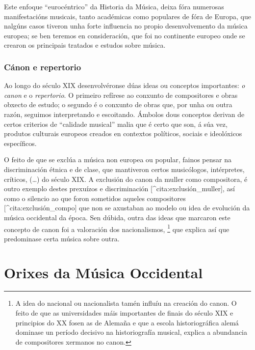 \documentclass[a4paper, twoside]{templates/ociamthesis}
\begin{document}
Este enfoque ``eurocéntrico'' da Historia da Música, deixa fóra numerosas manifestacións musicais, tanto académicas como populares de fóra de Europa, que nalgúns casos tiveron unha forte influencia no propio desenvolvemento da música europea; se ben teremos en consideración, que foi no continente europeo onde se crearon os principais tratados e estudos sobre música.

\hypertarget{cuxe1non-e-repertorio}{%
\subsection{Cánon e repertorio}\label{cuxe1non-e-repertorio}}

Ao longo do século XIX desenvolvéronse dúas ideas ou conceptos importantes: \emph{o canon} e o \emph{repertorio}. O primeiro refírese ao conxunto de compositores e obras obxecto de estudo; o segundo é o conxunto de obras que, por unha ou outra razón, seguimos interpretando e escoitando. Ámbolos dous conceptos derivan de certos criterios de ``calidade musical'' malia que é certo que son, á súa vez, produtos culturais europeos creados en contextos políticos, sociais e ideolóxicos específicos.

O feito de que se exclúa a música non europea ou popular, fainos pensar na discriminación étnica e de clase, que mantiveron certos musicólogos, intérpretes, críticos, (\ldots) do século XIX. A exclusión do canon da muller como compositora, é outro exemplo destes prexuízos e discriminación {[}\^{}cita:exclusión\_muller{]}, así como o silencio ao que foron sometidos aqueles compositores {[}\^{}cita:exclusión\_compo{]} que non se axustaban ao modelo ou idea de evolución da música occidental da época. Sen dúbida, outra das ideas que marcaron este concepto de canon foi a valoración dos nacionalismos, \footnote{A idea do nacional ou nacionalista tamén influíu na creación do canon. O feito de que as universidades máis importantes de finais do século XIX e principios do XX fosen as de Alemaña e que a escola historiográfica alemá dominase un período decisivo na historiografía musical, explica a abundancia de compositores xermanos no canon.} que explica así que predominase certa música sobre outra.

\hypertarget{orixes-da-muxfasica-occidental}{%
\chapter{Orixes da Música Occidental}\label{orixes-da-muxfasica-occidental}}
\end{document}
